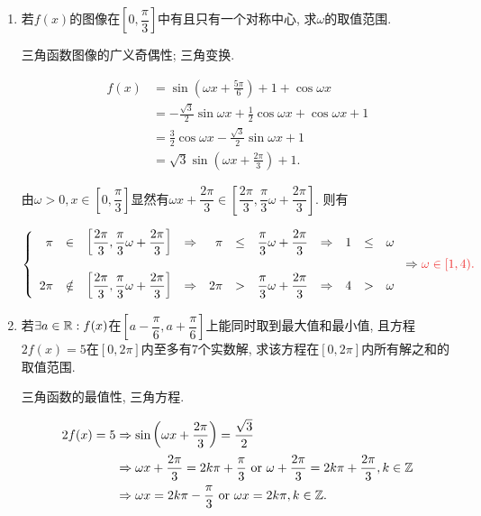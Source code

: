 \documentclass[8pt]{article}
\begin{document}
			\begin{enumerate}[label=\defmath{(\arabic*)}]
				\item 若\(f(x)\)的图像在\(\left[0, \dfrac{\pi}{3}\right]\)中有且只有一个对称中心, 求\(\omega\)的取值范围. \answord{\(\omega \in [1, 4).\)}

					三角函数图像的广义奇偶性; 三角变换.

					\begin{align*}
						f(x) &= \sin \left(\omega x + \frac{5\pi}{6}\right) + 1 + \cos\omega x\\
						     &= -\frac{\sqrt{3}}{2} \sin \omega x + \frac{1}{2} \cos \omega x + \cos \omega x + 1\\
						     &= \frac{3}{2} \cos \omega x - \frac{\sqrt{3}}{2} \sin \omega x + 1\\
						     &= \sqrt{3} \sin \left(\omega x + \frac{2\pi}{3}\right) + 1.
					\end{align*}

					由\(\omega > 0, x \in \left [0, \dfrac{\pi}{3}\right]\)显然有\(\omega x + \dfrac{2\pi}{3} \in \left[\dfrac{2\pi}{3}, \dfrac{\pi}{3} \omega + \dfrac{2\pi}{3}\right]\). 则有

					\[
						\left\{
							\begin{array}{rclcrclcrcl}
								\pi & \in & \left[\dfrac{2\pi}{3}, \dfrac{\pi}{3} \omega + \dfrac{2\pi}{3}\right] & \Rightarrow & \pi & \leq & \dfrac{\pi}{3} \omega + \dfrac{2\pi}{3} & \Rightarrow & 1 & \leq & \omega\\\\
								2\pi & \notin & \left[\dfrac{2\pi}{3}, \dfrac{\pi}{3} \omega + \dfrac{2\pi}{3}\right] & \Rightarrow & 2\pi & > & \dfrac{\pi}{3}\omega + \dfrac{2\pi}{3} & \Rightarrow & 4 & > & \omega\\
							\end{array}
						\right.
						\Rightarrow
						\ansmath{\omega \in [1, 4).}
					\]

				\item 若\(\exists a \in \mathbb{R}: f(x)\)在\(\left[a - \dfrac{\pi}{6}, a + \dfrac{\pi}{6} \right]\)上能同时取到最大值和最小值, 且方程\(2f(x)=5\)在\([0, 2\pi]\)内至多有\(7\)个实数解, 求该方程在\([0, 2\pi]\)内所有解之和的取值范围. 

					三角函数的最值性, 三角方程.

					\begin{align*}
						2f(x) = 5 &\Rightarrow \sin \left(\omega x + \frac{2 \pi}{3}\right) = \frac{\sqrt{3}}{2}\\
						          &\Rightarrow \omega x + \frac{2\pi}{3} = 2k\pi + \frac{\pi}{3} \text{ or } \omega + \frac{2\pi}{3} = 2k\pi + \frac{2\pi}{3}, k\in \mathbb{Z}\\
						          &\Rightarrow \omega x = 2k\pi - \frac{\pi}{3} \text{ or } \omega x = 2k\pi, k\in \mathbb{Z}.
					\end{align*}


\end{enumerate}
\end{document}
